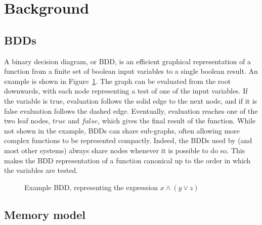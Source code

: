 \section{Background}
\subsection{BDDs}

A binary decision diagram, or BDD, is an efficient graphical
representation of a function from a finite set of boolean input
variables to a single boolean result.  An example is shown in
Figure~\ref{fig:intro:example_bdd}.  The graph can be evaluated from
the root downwards, with each node representing a test of one of the
input variables.  If the variable is true, evaluation follows the
solid edge to the next node, and if it is false evaluation follows the
dashed edge.  Eventually, evaluation reaches one of the two leaf
nodes, $\mathit{true}$ and $\mathit{false}$, which gives the final
result of the function.    While not shown
in the example, BDDs can share sub-graphs, often allowing more complex
functions to be represented compactly.  Indeed, the BDDs used by
{\implementation} (and most other systems) always share nodes whenever
it is possible to do so.  This makes the BDD representation of a
function canonical up to the order in which the variables are
tested.


\begin{figure}
  \caption{Example BDD, representing the expression $x \wedge (y \vee z)$}
  \label{fig:intro:example_bdd}
\end{figure}

\subsection{Memory model}

